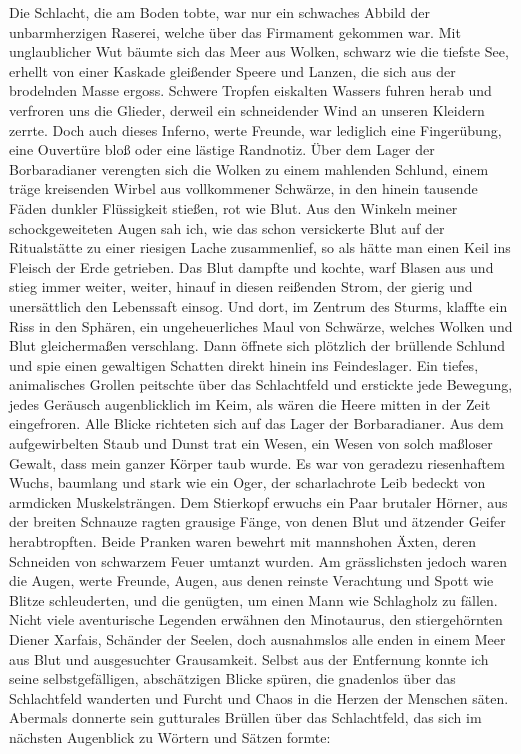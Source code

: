 Die Schlacht, die am Boden tobte, war nur ein schwaches Abbild der unbarmherzigen Raserei, welche über das Firmament gekommen war. Mit unglaublicher Wut bäumte sich das Meer aus Wolken, schwarz wie die tiefste See, erhellt von einer Kaskade gleißender Speere und Lanzen, die sich aus der brodelnden Masse ergoss. Schwere Tropfen eiskalten Wassers fuhren herab und verfroren uns die Glieder, derweil ein schneidender Wind an unseren Kleidern zerrte. Doch auch dieses Inferno, werte Freunde, war lediglich eine Fingerübung, eine Ouvertüre bloß oder eine lästige Randnotiz. Über dem Lager der Borbaradianer verengten sich die Wolken zu einem mahlenden Schlund, einem träge kreisenden Wirbel aus vollkommener Schwärze, in den hinein tausende Fäden dunkler Flüssigkeit stießen, rot wie Blut. Aus den Winkeln meiner schockgeweiteten Augen sah ich, wie das schon versickerte Blut auf der Ritualstätte zu einer riesigen Lache zusammenlief, so als hätte man einen Keil ins Fleisch der Erde getrieben. Das Blut dampfte und kochte, warf Blasen aus und stieg immer weiter, weiter, hinauf in diesen reißenden Strom, der gierig und unersättlich den Lebenssaft einsog. Und dort, im Zentrum des Sturms, klaffte ein Riss in den Sphären, ein ungeheuerliches Maul von Schwärze, welches Wolken und Blut gleichermaßen verschlang. Dann öffnete sich plötzlich der brüllende Schlund und spie einen gewaltigen Schatten direkt hinein ins Feindeslager. Ein tiefes, animalisches Grollen peitschte über das Schlachtfeld und erstickte jede Bewegung, jedes Geräusch augenblicklich im Keim, als wären die Heere mitten in der Zeit eingefroren. Alle Blicke richteten sich auf das Lager der Borbaradianer. Aus dem aufgewirbelten Staub und Dunst trat ein Wesen, ein Wesen von solch maßloser Gewalt, dass mein ganzer Körper taub wurde. Es war von geradezu riesenhaftem Wuchs, baumlang und stark wie ein Oger, der scharlachrote Leib bedeckt von armdicken Muskelsträngen. Dem Stierkopf erwuchs ein Paar brutaler Hörner, aus der breiten Schnauze ragten grausige Fänge, von denen Blut und ätzender Geifer herabtropften. Beide Pranken waren bewehrt mit mannshohen Äxten, deren Schneiden von schwarzem Feuer umtanzt wurden. Am grässlichsten jedoch waren die Augen, werte Freunde, Augen, aus denen reinste Verachtung und Spott wie Blitze schleuderten, und die genügten, um einen Mann wie Schlagholz zu fällen. Nicht viele aventurische Legenden erwähnen den Minotaurus, den stiergehörnten Diener Xarfais, Schänder der Seelen, doch ausnahmslos alle enden in einem Meer aus Blut und ausgesuchter Grausamkeit. Selbst aus der Entfernung konnte ich seine selbstgefälligen, abschätzigen Blicke spüren, die gnadenlos über das Schlachtfeld wanderten und Furcht und Chaos in die Herzen der Menschen säten. Abermals donnerte sein gutturales Brüllen über das Schlachtfeld, das sich im nächsten Augenblick zu Wörtern und Sätzen formte:

